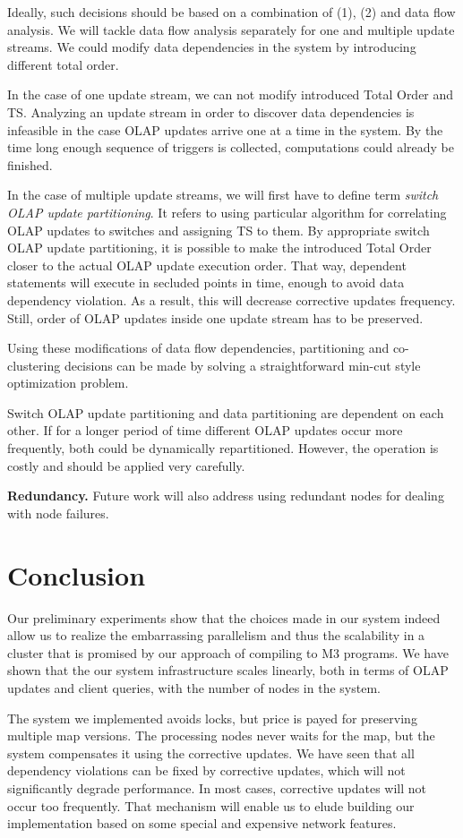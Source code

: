 \documentclass{sig-semester}
\def\OLAP{OLAP\xspace}
\def\EXORD{actual OLAP update execution order\xspace}
\begin{document}
Ideally, such decisions should be based on a combination of (1), (2) and data flow analysis. We will tackle data flow analysis separately for one and multiple update streams. We could modify data dependencies in the system by introducing different total order.

In the case of one update stream, we can not modify introduced Total Order and TS. Analyzing an update stream in order to discover data dependencies is infeasible in the case \OLAP updates arrive one at a time in the system. By the time long enough sequence of triggers is collected, computations could already be finished.

In the case of multiple update streams, we will first have to define term \textit{switch \OLAP update partitioning}. It refers to using particular algorithm for correlating \OLAP updates to switches and assigning TS to them. By appropriate switch \OLAP update partitioning, it is possible to make the introduced Total Order closer to the \EXORD. That way, dependent statements will execute in secluded points in time, enough to avoid data dependency violation. As a result, this will decrease corrective updates frequency. Still, order of \OLAP updates inside one update stream has to be preserved.

Using these modifications of data flow dependencies, partitioning and co-clustering decisions can be made by solving a straightforward min-cut style optimization problem.

Switch \OLAP update partitioning and data partitioning are dependent on each other. If for a longer period of time different \OLAP updates occur more frequently, both could be dynamically repartitioned. However, the operation is costly and should be applied very carefully.

\textbf{Redundancy.} Future work will also address using redundant nodes for dealing with node failures. 

\section{Conclusion}
\label{sec:Conclusion}
\vspace{2mm}

Our preliminary experiments show that the choices made in our
system indeed allow us to realize the embarrassing parallelism and
thus the scalability in a cluster that is promised by our approach of
compiling to M3 programs.  We have shown that the our system infrastructure scales linearly, both in terms of \OLAP updates and client queries, with the number of nodes in the system.

The system we implemented avoids locks, but price is payed for preserving multiple map versions. The processing nodes never waits for the map, but the system compensates it using the corrective updates. We have seen that all dependency violations can be fixed by corrective updates, which will not significantly degrade performance. In most cases, corrective updates will not occur too frequently. That mechanism will enable us to elude building our implementation based on some special and expensive network features.

{


}

\newpage
\end{document}
